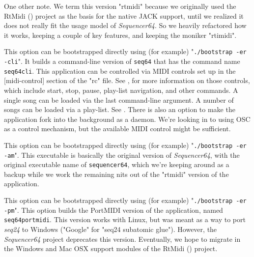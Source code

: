         One other note.  We term this version "rtmidi" because we originally
        used the RtMidi (\cite{rtmidi}) project as the basis for the native
        JACK support, until we realized it does not really fit the usage model
        of \textsl{Sequencer64}.  So we heavily refactored how it works,
        keeping a couple of key features, and keeping the moniker "rtimidi".

        This option can be bootstrapped directly using (for example)
        "\texttt{./bootstrap -er -cli}".
        It builds a command-line version of \texttt{seq64} that has the command
        name \texttt{seq64cli}.  This application can be
        controlled via MIDI controls set up in the
        [midi-control] section of the "rc" file.
        See , for more
        information on those controls, which include start, stop,
        pause, play-list navigation, and other commands.
        A single song can be loaded via
        the last command-line argument.
        A number of songs can be loaded via a play-list.
        See .
        There is also an option to make
        the application fork into the background as a daemon.
        We're looking in to using OSC as a control mechanism, but the available
        MIDI control might be sufficient.

        This option can be bootstrapped directly using (for example)
        "\texttt{./bootstrap -er -am}".
        This executable is basically the original version of 
        \textsl{Sequencer64}, with the original executable name of
        \texttt{sequencer64}, which we're keeping around as a backup while we
        work the remaining nits out of the "rtmidi" version of the application.

        This option can be bootstrapped directly using (for example)
        "\texttt{./bootstrap -er -pm}".
        This option builds the PortMIDI version of the application,
        named \texttt{seq64portmidi}.  This version works with Linux, but was
        meant as a way to port \textsl{seq24} to Windows ("Google" for
        "seq24 subatomic glue").  However, the \textsl{Sequencer64} project
        deprecates this version.  Eventually, we hope to migrate in
        the Windows and Mac OSX support modules of the RtMidi
        (\cite{rtmidi}) project.


